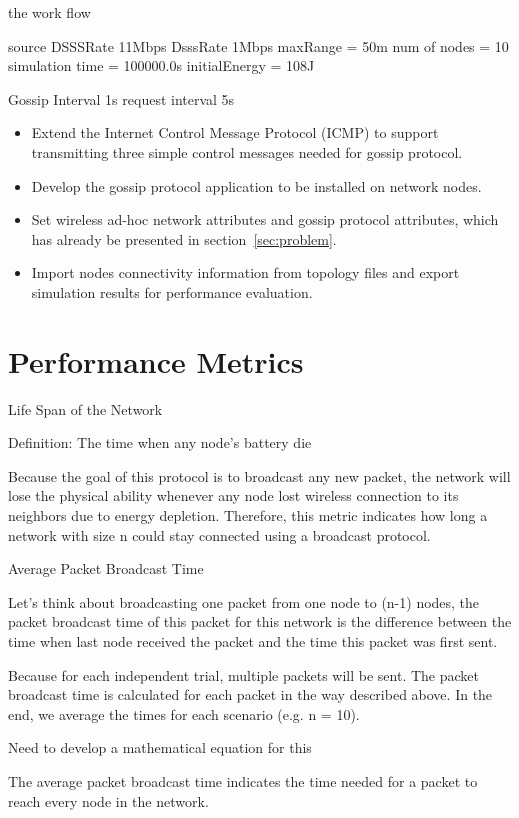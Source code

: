 the work flow



source DSSSRate 11Mbps
DsssRate 1Mbps
maxRange = 50m
num of nodes = 10
simulation time = 100000.0s
initialEnergy = 108J

Gossip Interval 1s
request interval 5s



\begin{itemize}
	\item Extend the Internet Control Message Protocol (ICMP) to support transmitting three simple control messages needed for gossip protocol.
	\item Develop the gossip protocol application to be installed on network nodes.
	\item Set wireless ad-hoc network attributes and gossip protocol attributes, which has already be presented in section~\ref{sec:problem}.
	\item Import nodes connectivity information from topology files and export simulation results for performance evaluation.
\end{itemize}


\section{Performance Metrics}
Life Span of the Network

Definition: The time when any node's battery die

Because the goal of this protocol is to broadcast any new packet, the network will lose the physical ability whenever any node lost wireless connection to its neighbors due to energy depletion. Therefore, this metric indicates how long a network with size n could stay connected using a broadcast protocol.

Average Packet Broadcast Time

Let's think about broadcasting one packet from one node to (n-1) nodes, the packet broadcast time of this packet for this network is the difference between the time when last node received the packet and the time this packet was first sent.

Because for each independent trial, multiple packets will be sent. The packet broadcast time is calculated for each packet in the way described above. In the end, we average the times for each scenario (e.g. n = 10). 

Need to develop a mathematical equation for this

The average packet broadcast time indicates the time needed for a packet to reach every node in the network.

